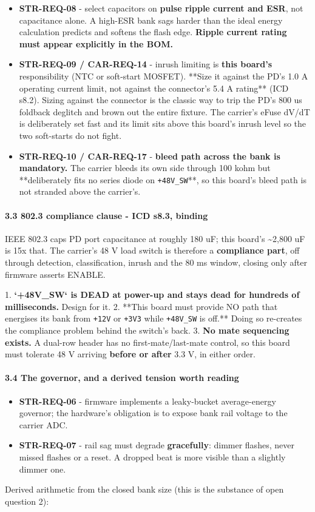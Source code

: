 \documentclass[11pt,a4paper]{article}
\begin{document}
\begin{itemize}
\item \textbf{STR-REQ-08} - select capacitors on \textbf{pulse ripple current and ESR}, not capacitance
alone. A high-ESR bank sags harder than the ideal energy calculation predicts and softens
the flash edge. \textbf{Ripple current rating must appear explicitly in the BOM.}
\item \textbf{STR-REQ-09 / CAR-REQ-14} - inrush limiting is \textbf{this board's} responsibility (NTC or
soft-start MOSFET). {*}{*}Size it against the PD's 1.0 A operating current limit, not against
the connector's 5.4 A rating{*}{*} (ICD s8.2). Sizing against the connector is the classic way
to trip the PD's 800 us foldback deglitch and brown out the entire fixture. The carrier's
eFuse dV/dT is deliberately set fast and its limit sits above this board's inrush level so
the two soft-starts do not fight.
\item \textbf{STR-REQ-10 / CAR-REQ-17} - \textbf{bleed path across the bank is mandatory.} The carrier
bleeds its own side through 100 kohm but {*}{*}deliberately fits no series diode on
\texttt{+48V\_SW}{*}{*}, so this board's bleed path is not stranded above the carrier's.
\end{itemize}
\paragraph*{3.3 802.3 compliance clause - ICD s8.3, binding}
IEEE 802.3 caps PD port capacitance at roughly 180 uF; this board's \textasciitilde{}2,800 uF is 15x that. The carrier's 48 V load switch is therefore a \textbf{compliance part}, off through detection, classification, inrush and the 80 ms window, closing only after firmware asserts ENABLE.

1. \textbf{`+48V\_SW` is DEAD at power-up and stays dead for hundreds of milliseconds.} Design for it. 2. {*}{*}This board must provide NO path that energises its bank from \texttt{+12V} or \texttt{+3V3} while \texttt{+48V\_SW} is off.{*}{*} Doing so re-creates the compliance problem behind the switch's back. 3. \textbf{No mate sequencing exists.} A dual-row header has no first-mate/last-mate control, so this board must tolerate 48 V arriving \textbf{before or after} 3.3 V, in either order.

\paragraph*{3.4 The governor, and a derived tension worth reading}
\begin{itemize}
\item \textbf{STR-REQ-06} - firmware implements a leaky-bucket average-energy governor; the hardware's
obligation is to expose bank rail voltage to the carrier ADC.
\item \textbf{STR-REQ-07} - rail sag must degrade \textbf{gracefully}: dimmer flashes, never missed flashes
or a reset. A dropped beat is more visible than a slightly dimmer one.
\end{itemize}
Derived arithmetic from the closed bank size (this is the substance of open question 2):
\end{document}
